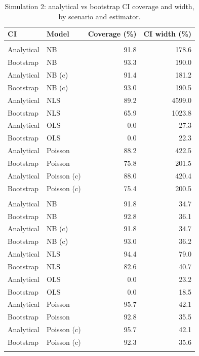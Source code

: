 \begin{table}[ht!]
\caption{\label{tbl-sim2-ci-comparison}Simulation 2: analytical vs bootstrap CI coverage and width, by scenario and estimator.} 
\fontsize{8.0pt}{9.0pt}\selectfont
\begin{tabular*}{\linewidth}{@{\extracolsep{\fill}}llrr}
\toprule
CI & Model & Coverage (\%) & CI width (\%) \\ 
\midrule\addlinespace[2.5pt]
\multicolumn{4}{l}{NB($n$)-NB($m$)} \\[2.5pt] 
\midrule\addlinespace[2.5pt]
Analytical & NB & 91.8 & 178.6 \\ 
Bootstrap & NB & 93.3 & 190.0 \\ 
Analytical & NB (c) & 91.4 & 181.2 \\ 
Bootstrap & NB (c) & 93.0 & 190.5 \\ 
Analytical & NLS & 89.2 & 4599.0 \\ 
Bootstrap & NLS & 65.9 & 1023.8 \\ 
Analytical & OLS & 0.0 & 27.3 \\ 
Bootstrap & OLS & 0.0 & 22.3 \\ 
Analytical & Poisson & 88.2 & 422.5 \\ 
Bootstrap & Poisson & 75.8 & 201.5 \\ 
Analytical & Poisson (c) & 88.0 & 420.4 \\ 
Bootstrap & Poisson (c) & 75.4 & 200.5 \\ 
\midrule\addlinespace[2.5pt]
\multicolumn{4}{l}{NB($n$)-Po($m$)} \\[2.5pt] 
\midrule\addlinespace[2.5pt]
Analytical & NB & 91.8 & 34.7 \\ 
Bootstrap & NB & 92.8 & 36.1 \\ 
Analytical & NB (c) & 91.8 & 34.7 \\ 
Bootstrap & NB (c) & 93.0 & 36.2 \\ 
Analytical & NLS & 94.4 & 79.0 \\ 
Bootstrap & NLS & 82.6 & 40.7 \\ 
Analytical & OLS & 0.0 & 23.2 \\ 
Bootstrap & OLS & 0.0 & 18.5 \\ 
Analytical & Poisson & 95.7 & 42.1 \\ 
Bootstrap & Poisson & 92.8 & 35.5 \\ 
Analytical & Poisson (c) & 95.7 & 42.1 \\ 
Bootstrap & Poisson (c) & 92.3 & 35.6 \\ 
\midrule\addlinespace[2.5pt]
\multicolumn{4}{l}{Po($n$)-NB($m$)} \\[2.5pt] 

\end{tabular*}
\end{table}
